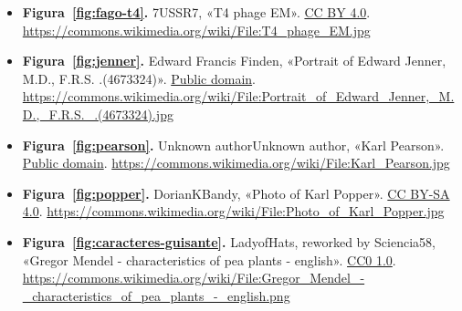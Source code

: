 \documentclass{book}
\begin{document}
\begin{itemize}
\item \textbf{Figura~\ref{fig:fago-t4}.} 7USSR7, «T4 phage EM». \href{https://creativecommons.org/licenses/by/4.0/}{CC BY 4.0}. \url{https://commons.wikimedia.org/wiki/File:T4_phage_EM.jpg}
\item \textbf{Figura~\ref{fig:jenner}.} Edward Francis Finden, «Portrait of Edward Jenner, M.D., F.R.S. .(4673324)». \href{https://creativecommons.org/publicdomain/mark/1.0/}{Public domain}. \url{https://commons.wikimedia.org/wiki/File:Portrait_of_Edward_Jenner,_M.D.,_F.R.S._.(4673324).jpg}
\item \textbf{Figura~\ref{fig:pearson}.} Unknown authorUnknown author, «Karl Pearson». \href{https://creativecommons.org/publicdomain/mark/1.0/}{Public domain}. \url{https://commons.wikimedia.org/wiki/File:Karl_Pearson.jpg}
\item \textbf{Figura~\ref{fig:popper}.} DorianKBandy, «Photo of Karl Popper». \href{https://creativecommons.org/licenses/by-sa/4.0/}{CC BY-SA 4.0}. \url{https://commons.wikimedia.org/wiki/File:Photo_of_Karl_Popper.jpg}
\item \textbf{Figura~\ref{fig:caracteres-guisante}.} LadyofHats, reworked by Sciencia58, «Gregor Mendel - characteristics of pea plants - english». \href{https://creativecommons.org/publicdomain/zero/1.0/}{CC0 1.0}. \url{https://commons.wikimedia.org/wiki/File:Gregor_Mendel_-_characteristics_of_pea_plants_-_english.png}
\end{itemize}
\backmatter
\end{document}
